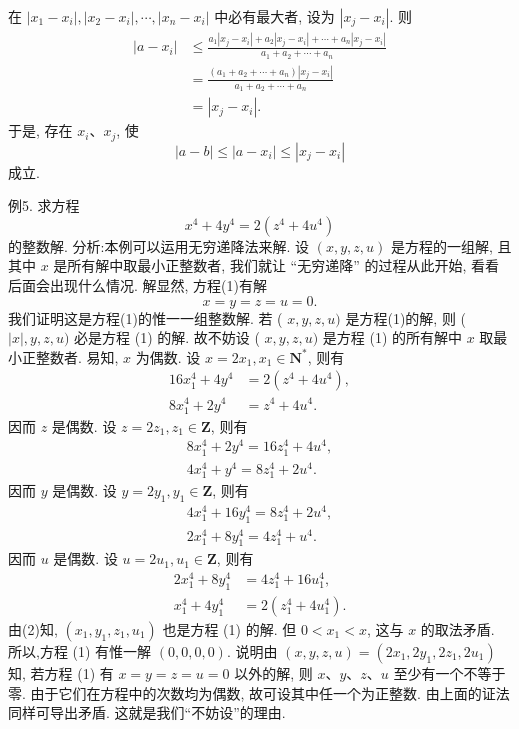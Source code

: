 在 $\left|x_1-x_i\right|,\left|x_2-x_i\right|, \cdots,\left|x_n-x_i\right|$ 中必有最大者, 设为 $\left|x_j-x_i\right|$.
则
$$
\begin{aligned}
\left|a-x_i\right| & \leqslant \frac{a_1\left|x_j-x_i\right|+a_2\left|x_j-x_i\right|+\cdots+a_n\left|x_j-x_i\right|}{a_1+a_2+\cdots+a_n} \\
& =\frac{\left(a_1+a_2+\cdots+a_n\right)\left|x_j-x_i\right|}{a_1+a_2+\cdots+a_n} \\
& =\left|x_j-x_i\right| .
\end{aligned}
$$
于是, 存在 $x_i 、 x_j$, 使
$$
|a-b| \leqslant\left|a-x_i\right| \leqslant\left|x_j-x_i\right|
$$
成立.



例5. 求方程
$$
x^4+4 y^4=2\left(z^4+4 u^4\right)
$$
的整数解.
分析:本例可以运用无穷递降法来解.
设 $(x, y, z, u)$ 是方程的一组解, 且其中 $x$ 是所有解中取最小正整数者, 我们就让 “无穷递降” 的过程从此开始, 看看后面会出现什么情况.
解显然, 方程(1)有解
$$
x=y=z=u=0 .
$$
我们证明这是方程(1)的惟一一组整数解.
若 ( $x, y, z, u)$ 是方程(1)的解, 则 ( $|x|, y, z, u)$ 必是方程 (1) 的解.
故不妨设 ( $x, y, z, u)$ 是方程 (1) 的所有解中 $x$ 取最小正整数者.
易知, $x$ 为偶数.
设 $x=2 x_1, x_1 \in \mathbf{N}^*$, 则有
$$
\begin{aligned}
16 x_1^4+4 y^4 & =2\left(z^4+4 u^4\right), \\
8 x_1^4+2 y^4 & =z^4+4 u^4 .
\end{aligned}
$$
因而 $z$ 是偶数.
设 $z=2 z_1, z_1 \in \mathbf{Z}$, 则有
$$
\begin{gathered}
8 x_1^4+2 y^4=16 z_1^4+4 u^4, \\
4 x_1^4+y^4=8 z_1^4+2 u^4 .
\end{gathered}
$$
因而 $y$ 是偶数.
设 $y=2 y_1, y_1 \in \mathbf{Z}$, 则有
$$
\begin{gathered}
4 x_1^4+16 y_1^4=8 z_1^4+2 u^4, \\
2 x_1^4+8 y_1^4=4 z_1^4+u^4 .
\end{gathered}
$$
因而 $u$ 是偶数.
设 $u=2 u_1, u_1 \in \mathbf{Z}$, 则有
$$
\begin{aligned}
2 x_1^4+8 y_1^4 & =4 z_1^4+16 u_1^4, \\
x_1^4+4 y_1^4 & =2\left(z_1^4+4 u_1^4\right) .
\end{aligned}
$$
由(2)知, $\left(x_1, y_1, z_1, u_1\right)$ 也是方程 (1) 的解.
但 $0<x_1<x$, 这与 $x$ 的取法矛盾.
所以,方程 (1) 有惟一解 $(0,0,0,0)$.
说明由 $(x, y, z, u)=\left(2 x_1, 2 y_1, 2 z_1, 2 u_1\right)$ 知, 若方程 (1) 有 $x=y=z=u=0$ 以外的解, 则 $x 、 y 、 z 、 u$ 至少有一个不等于零.
由于它们在方程中的次数均为偶数, 故可设其中任一个为正整数.
由上面的证法同样可导出矛盾.
这就是我们“不妨设”的理由.



